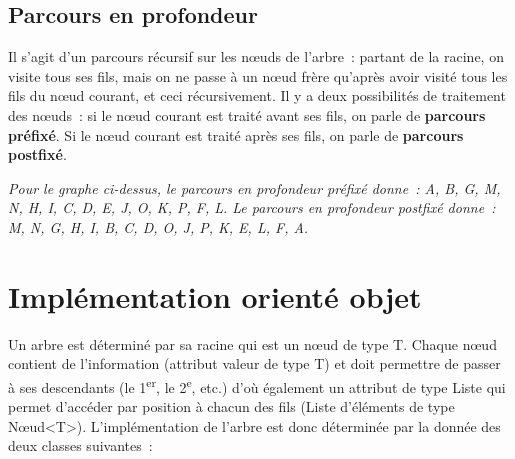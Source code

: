 	\subsection{Parcours en profondeur}
	
		Il s'agit d'un parcours récursif sur les n{\oe}uds de l'arbre~: 
		partant de la racine, on visite tous ses fils, mais on
			ne passe à un n{\oe}ud frère qu'après avoir visité tous les 
			fils du n{\oe}ud courant, et ceci récursivement. Il y a
			deux possibilités de traitement des n{\oe}uds~: si le 
			n{\oe}ud courant est traité avant ses fils, on parle de
			\textbf{parcours préfixé}. Si le n{\oe}ud courant est 
			traité après ses fils, on parle de \textbf{parcours postfixé}.

			{\itshape
			Pour le graphe ci-dessus, le parcours en profondeur préfixé donne~: 
			A, B, G, M, N, H, I, C, D, E, J, O, K, P, F, L. 
			Le parcours en profondeur postfixé donne~: 
			M, N, G, H, I, B, C, D, O, J, P, K, E, L, F, A.}
			

\section{Implémentation orienté objet}

	Un arbre est déterminé par sa racine qui est un n{\oe}ud de type T. 
	Chaque n{\oe}ud contient de l'information (attribut
	valeur de type T) et doit permettre de passer à ses 
	descendants (le 1\textsuperscript{er}, le 2\textsuperscript{e},
	etc.) d'où également un attribut de type Liste qui permet 
	d'accéder par position à chacun des fils (Liste d'éléments de
	type N{\oe}ud<T>). L'implémentation de l'arbre est donc 
	déterminée par la donnée des deux classes suivantes~: 
	
	
